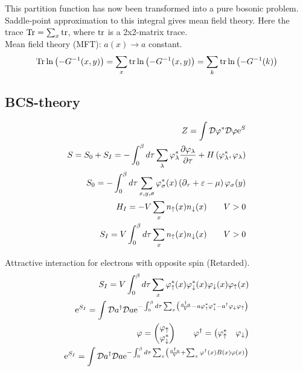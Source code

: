 This partition function has now been transformed into a pure bosonic problem. Saddle-point approximation to this integral gives mean field theory. Here the trace $\Tr = \sum_{x} \tr$, where $\tr$ is a 2x2-matrix trace. \\ 

Mean field theory (MFT): $a(x) \to a$ constant. \\

\begin{equation*}
    \Tr \ln \left(-G ^{-1}(x,y)\right) = \sum_x \tr \ln \left(-G ^{-1}(x,y)\right) = \sum_k \tr \ln \left(-G ^{-1}(k)\right)
\end{equation*}

\subsection{BCS-theory}

\begin{align*}
    Z = \int \mathcal{D} \varphi^* \mathcal{D} \varphi \mathrm{e}^S \\ 
    S = S_0 + S_I = - \int_0^\beta d \tau \sum_\lambda \varphi_\lambda^* \pdv{\varphi_\lambda}{\tau} + H\left(\varphi_\lambda^*, \varphi_\lambda \right) \\ 
    S_0 = - \int_0^\beta d \tau \sum_{x,y,\sigma} \varphi_\sigma ^* (x) \left( \partial_\tau + \varepsilon - \mu \right) \varphi_\sigma (y) \\ 
    H_I = -V \sum_x n_\uparrow(x) n_\downarrow(x) \quad \quad V > 0 \\ 
    S_I = V \int_0^\beta d \tau \sum_x n_\uparrow(x) n_\downarrow(x) \quad \quad V > 0
\end{align*}

Attractive interaction for electrons with opposite spin (Retarded). \\ 
\begin{align*}
    S_I = V \int_0^\beta d \tau \sum_x \varphi_\uparrow^*(x) \varphi_\downarrow^* (x) \varphi_\downarrow(x) \varphi_\uparrow(x) \\ 
    \mathrm{e}^{S_I} = \int \mathcal{D}a^{\dagger} \mathcal{D} a \mathrm{e}^{- \int_0^\beta d \tau \sum_x \left( \frac{a^{\dagger} a}{V} - a \varphi_\uparrow^* \varphi_\downarrow^* - a^{\dagger} \varphi_\downarrow \varphi_\uparrow \right)} \\ 
    \varphi = \begin{pmatrix} \varphi_\uparrow \\ \varphi_\downarrow^* \end{pmatrix} \quad \quad \varphi^\dagger = \begin{pmatrix} \varphi_\uparrow^* & \varphi_\downarrow \end{pmatrix} \\ 
    \mathrm{e}^{S_I} = \int \mathcal{D}a^{\dagger} \mathcal{D} a \mathrm{e}^{- \int_0^\beta d \tau \sum_x \left( \frac{a^{\dagger} a}{V} + \sum_x \varphi^\dagger (x) B(x) \varphi(x) \right)}
\end{align*}

